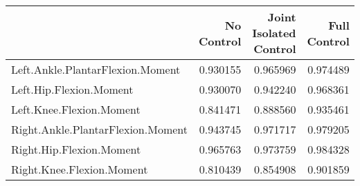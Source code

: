 \begin{tabular}{lrrr}
\toprule
{} &  No Control &  Joint Isolated Control &  Full Control \\
\midrule
Left.Ankle.PlantarFlexion.Moment  &    0.930155 &                0.965969 &      0.974489 \\
Left.Hip.Flexion.Moment           &    0.930070 &                0.942240 &      0.968361 \\
Left.Knee.Flexion.Moment          &    0.841471 &                0.888560 &      0.935461 \\
Right.Ankle.PlantarFlexion.Moment &    0.943745 &                0.971717 &      0.979205 \\
Right.Hip.Flexion.Moment          &    0.965763 &                0.973759 &      0.984328 \\
Right.Knee.Flexion.Moment         &    0.810439 &                0.854908 &      0.901859 \\
\bottomrule
\end{tabular}
